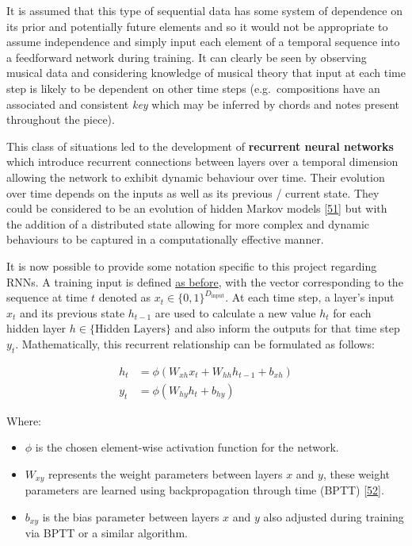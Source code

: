 \documentclass[12pt,]{article}
\providecommand{\tightlist}{%
  \setlength{\itemsep}{0pt}\setlength{\parskip}{0pt}}
\begin{document}
It is assumed that this type of sequential data has some system of
dependence on its prior and potentially future elements and so it would
not be appropriate to assume independence and simply input each element
of a temporal sequence into a feedforward network during training. It
can clearly be seen by observing musical data and considering knowledge
of musical theory that input at each time step is likely to be dependent
on other time steps (e.g.~compositions have an associated and consistent
\emph{key} which may be inferred by chords and notes present throughout
the piece).

This class of situations led to the development of \textbf{recurrent
neural networks} which introduce recurrent connections between layers
over a temporal dimension allowing the network to exhibit dynamic
behaviour over time. Their evolution over time depends on the inputs as
well as its previous / current state. They could be considered to be an
evolution of hidden Markov models
{[}\protect\hyperlink{ref-baum1966}{51}{]} but with the addition of a
distributed state allowing for more complex and dynamic behaviours to be
captured in a computationally effective manner.

It is now possible to provide some notation specific to this project
regarding RNNs. A training input is defined
\protect\hyperlink{buildinganeffectiverepresentationfortraining}{as
before}, with the vector corresponding to the sequence at time \(t\)
denoted as \(x_t\in \{0,1\}^{D_{\text{input}}}\). At each time step, a
layer's input \(x_t\) and its previous state \(h_{t-1}\) are used to
calculate a new value \(h_t\) for each hidden layer
\(h\in\{\text{Hidden Layers}\}\) and also inform the outputs for that
time step \(y_t\). Mathematically, this recurrent relationship can be
formulated as follows:

\[\begin{aligned}
h_t &= \phi(W_{xh} x_t + W_{hh} h_{t-1} + b_{xh}) \\
y_t &= \phi(W_{hy} h_t + b_{hy})
\end{aligned}\]

Where:

\begin{itemize}
\tightlist
\item
  \(\phi\) is the chosen element-wise activation function for the
  network.
\item
  \(W_{xy}\) represents the weight parameters between layers \(x\) and
  \(y\), these weight parameters are learned using backpropagation
  through time (BPTT)
  {[}\protect\hyperlink{ref-werbos1990backpropagation}{52}{]}.
\item
  \(b_{xy}\) is the bias parameter between layers \(x\) and \(y\) also
  adjusted during training via BPTT or a similar algorithm.
\end{itemize}
\end{document}
